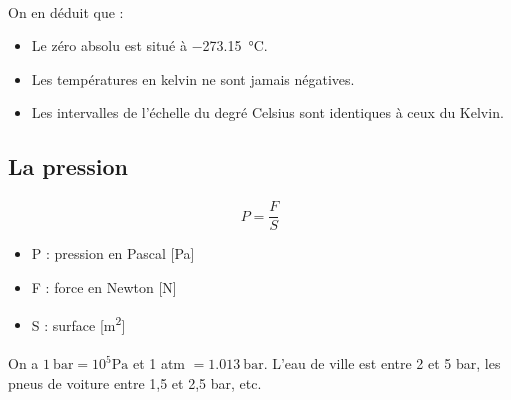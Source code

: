 \documentclass{article}
\begin{document}
            \paragraph{}
            On en déduit que :
            \begin{itemize}
                \item Le zéro absolu est situé à \SI{-273,15}{\celsius}.
                \item Les températures en kelvin ne sont jamais négatives.
                \item Les intervalles de l'échelle du degré Celsius sont identiques à ceux du Kelvin.
            \end{itemize}

        \subsection{La pression}
            \paragraph{}
            $$P = \frac{F}{S}$$
            \begin{itemize}
                \item P : pression en Pascal [\si{\pascal}]
                \item F : force en Newton [\si{\newton}]
                \item S : surface [\si{\square \meter}]
            \end{itemize}

            \paragraph{}
            On a $\SI{1}{\bar} = 10^5 \si{\pascal}$ et 1 atm $= \SI{1,013}{\bar}$. L'eau de ville est entre 2 et 5 bar, les pneus de voiture entre 1,5 et 2,5 bar, etc.
\end{document}
